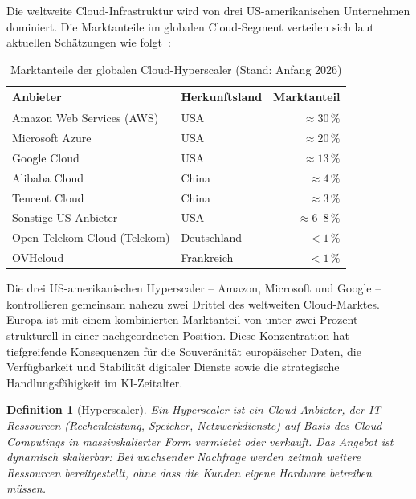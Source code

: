 \documentclass[12pt, a4paper, openany]{report}
\newtheorem{definition}[theorem]{Definition}
\begin{document}
Die weltweite Cloud-Infrastruktur wird von drei US-amerikanischen
Unternehmen dominiert. Die Marktanteile im globalen Cloud-Segment verteilen
sich laut aktuellen Schätzungen wie folgt~\cite{leipold2026chip}:

\begin{table}[H]
	\centering
	\caption{Marktanteile der globalen Cloud-Hyperscaler (Stand: Anfang 2026)}
	\label{tab:cloud_marktanteile}
	\begin{tabularx}{0.78\textwidth}{l l r}
		\toprule
		\textbf{Anbieter} & \textbf{Herkunftsland} & \textbf{Marktanteil} \\
		\midrule
		Amazon Web Services (AWS) & USA & $\approx 30\,\%$ \\
		Microsoft Azure            & USA & $\approx 20\,\%$ \\
		Google Cloud               & USA & $\approx 13\,\%$ \\
		\midrule
		Alibaba Cloud              & China & $\approx 4\,\%$ \\
		Tencent Cloud              & China & $\approx 3\,\%$ \\
		Sonstige US-Anbieter       & USA & $\approx 6$--$8\,\%$ \\
		\midrule
		Open Telekom Cloud (Telekom) & Deutschland & $< 1\,\%$ \\
		OVHcloud                   & Frankreich  & $< 1\,\%$ \\
		\bottomrule
	\end{tabularx}
\end{table}

\noindent
Die drei US-amerikanischen Hyperscaler -- Amazon, Microsoft und Google --
kontrollieren gemeinsam nahezu zwei Drittel des weltweiten Cloud-Marktes.
Europa ist mit einem kombinierten Marktanteil von unter zwei Prozent
strukturell in einer nachgeordneten Position. Diese Konzentration hat
tiefgreifende Konsequenzen für die Souveränität europäischer Daten, die
Verfügbarkeit und Stabilität digitaler Dienste sowie die strategische
Handlungsfähigkeit im KI-Zeitalter.

\begin{definition}[Hyperscaler]
	\label{def:hyperscaler}
	Ein \emph{Hyperscaler} ist ein Cloud-Anbieter, der IT-Ressourcen
	(Rechenleistung, Speicher, Netzwerkdienste) auf Basis des Cloud
	Computings in massivskalierter Form vermietet oder verkauft. Das Angebot
	ist dynamisch skalierbar: Bei wachsender Nachfrage werden zeitnah weitere
	Ressourcen bereitgestellt, ohne dass die Kunden eigene Hardware betreiben
	müssen.
\end{definition}
\end{document}
